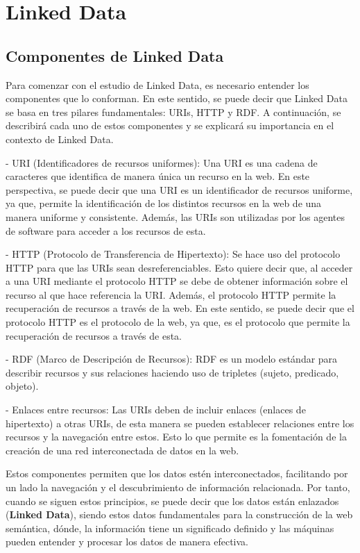 \documentclass[11pt]{report}
\begin{document}
\chapter{Linked Data}

\section{Componentes de Linked Data}

Para comenzar con el estudio de Linked Data, es necesario entender los componentes que lo conforman. En este sentido, se puede decir que Linked Data se basa en tres pilares fundamentales: URIs, HTTP y RDF. A continuación, se describirá cada uno de estos componentes y se explicará su importancia en el contexto de Linked Data.

- URI (Identificadores de recursos uniformes): Una URI es una cadena de caracteres que identifica de manera única un recurso en la web. En este perspectiva, se puede decir que una URI es un identificador de recursos uniforme, ya que, permite la identificación de los distintos recursos en la web de una manera uniforme y consistente. Además, las URIs son utilizadas por los agentes de software para acceder a los recursos de esta. 

- HTTP (Protocolo de Transferencia de Hipertexto): Se hace uso del protocolo HTTP para que las URIs sean desreferenciables. Esto quiere decir que, al acceder a una URI mediante el protocolo HTTP se debe de obtener información sobre el recurso al que hace referencia la URI. Además, el protocolo HTTP permite la recuperación de recursos a través de la web. En este sentido, se puede decir que el protocolo HTTP es el protocolo de la web, ya que, es el protocolo que permite la recuperación de recursos a través de esta. 

- RDF (Marco de Descripción de Recursos): RDF es un modelo estándar para describir recursos y sus relaciones haciendo uso de tripletes (sujeto, predicado, objeto). 

- Enlaces entre recursos: Las URIs deben de incluir enlaces (enlaces de hipertexto) a otras URIs, de esta manera se pueden establecer relaciones entre los recursos y la navegación entre estos. Esto lo que permite es la fomentación de la creación de una red interconectada de datos en la web.

Estos componentes permiten que los datos estén interconectados, facilitando por un lado la navegación y el descubrimiento de información relacionada. Por tanto, cuando se siguen estos principios, se puede decir que los datos están enlazados (\textbf{Linked Data}), siendo estos datos fundamentales para la construcción de la web semántica, dónde, la información tiene un significado definido y las máquinas pueden entender y procesar los datos de manera efectiva.
\end{document}
